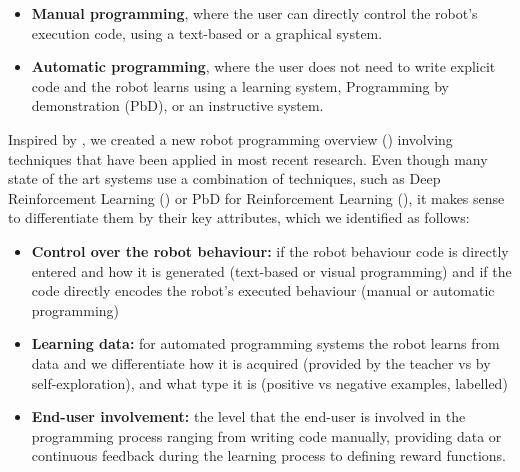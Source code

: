 \begin{itemize}
 \item {\textbf{Manual programming}, where the user can directly control the robot's execution code, using a text-based or a graphical system.}
 \item {\textbf{Automatic programming}, where the user does not need to write explicit code and the robot learns using a learning system, Programming by demonstration (PbD), or an instructive system.}
\end{itemize}


Inspired by \cite{Biggs2003}, we created a new robot programming overview () involving techniques that have been applied in most recent research.
Even though many state of the art systems use a combination of techniques, such as Deep Reinforcement Learning (\cite{arulkumaran2017brief}) or PbD for Reinforcement Learning (\cite{hester2017learning}), it makes sense to differentiate them by their key attributes, which we identified as follows: 
\begin{itemize}
	\item \textbf{Control over the robot behaviour:} if the robot behaviour code is directly entered and how it is generated (text-based or visual programming) and if the code directly encodes the robot's executed behaviour (manual or automatic programming)
	\item \textbf{Learning data:} for automated programming systems the robot learns from data and we differentiate how it is acquired (provided by the teacher vs by self-exploration), and what type it is (\eg positive vs negative examples, labelled)
	\item \textbf{End-user involvement:} the level that the end-user is involved in the programming process ranging from writing code manually, providing data or continuous feedback during the learning process to defining reward functions.
\end{itemize}

